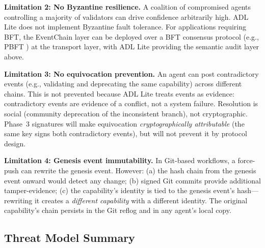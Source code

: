 \textbf{Limitation 2: No Byzantine resilience.} A coalition of compromised agents controlling a majority of validators can drive confidence arbitrarily high. ADL Lite does not implement Byzantine fault tolerance. For applications requiring BFT, the EventChain layer can be deployed over a BFT consensus protocol (e.g., PBFT \cite{pbft}) at the transport layer, with ADL Lite providing the semantic audit layer above.

\textbf{Limitation 3: No equivocation prevention.} An agent can post contradictory events (e.g., validating and deprecating the same capability) across different chains. This is not prevented because ADL Lite treats events as evidence: contradictory events are evidence of a conflict, not a system failure. Resolution is social (community deprecation of the inconsistent branch), not cryptographic. Phase~3 signatures will make equivocation \emph{cryptographically attributable} (the same key signs both contradictory events), but will not prevent it by protocol design.

\textbf{Limitation 4: Genesis event immutability.} In Git-based workflows, a force-push can rewrite the genesis event. However: (a) the hash chain from the genesis event onward would detect any change; (b) signed Git commits provide additional tamper-evidence; (c) the capability's identity is tied to the genesis event's hash---rewriting it creates a \emph{different capability} with a different identity. The original capability's chain persists in the Git reflog and in any agent's local copy.

\subsection{Threat Model Summary}

